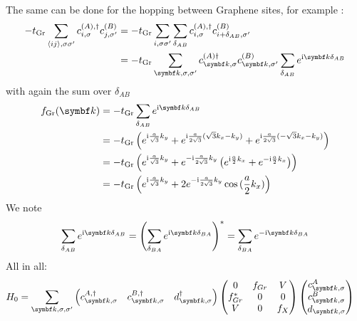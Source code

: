 \documentclass[../main.tex]{subfiles}
\begin{document}
The same can be done for the hopping between Graphene sites, for example :
\begin{align}
	-t_{\mathrm{Gr}} \sum_{\langle ij \rangle, \sigma \sigma^{\prime}} c_{i, \sigma}^{(A), \dagger} c_{j, \sigma^{\prime}}^{(B)}
	&= -t_{\mathrm{Gr}} \sum_{i, \sigma \sigma^{\prime}} \sum_{\delta_{AB}} c_{i, \sigma}^{(A), \dagger} c_{i + \delta_{AB} , \sigma^{\prime}}^{(B)} \\
	&= -t_{\mathrm{Gr}} \sum_{\vb{k}, \sigma, \sigma^{\prime}}  c_{\vb{k}, \sigma}^{(A) \dagger} c_{\vb{k}, \sigma^{\prime}}^{(B)} \sum_{\delta_{AB}} e^{\iu \vb{k} \delta_{AB}}
\end{align}
with again the sum over \(\delta_{AB}\)
\begin{align}
	f_{\mathrm{Gr}} (\vb{k}) &= -t_{\mathrm{Gr}} \sum_{\delta_{AB}} e^{\iu \vb{k} \delta_{AB}} \\
	&= -t_{\mathrm{Gr}} \left(
	e^{\iu \frac{a}{\sqrt{3}} k_y} +
	e^{\iu \frac{a}{2\sqrt{3}} (\sqrt{3} k_x - k_y)} +
	e^{\iu \frac{a}{2\sqrt{3}} (-\sqrt{3} k_x - k_y)} \right) \\
	&= -t_{\mathrm{Gr}} \left(
	e^{\iu \frac{a}{\sqrt{3}} k_y} +
	e^{-\iu \frac{a}{2\sqrt{3}} k_y} \left(
	e^{\iu \frac{a}{2} k_x} + e^{-\iu \frac{a}{2} k_x}
	\right) \right) \\
	&= -t_{\mathrm{Gr}} \left(
	e^{\iu \frac{a}{\sqrt{3}} k_y} +
	2 e^{-\iu \frac{a}{2\sqrt{3}} k_y}
	\cos{(\frac{a}{2} k_x)} \right)
\end{align}
We note 
\begin{align}
	\sum_{\delta_{AB}} e^{\iu \vb{k} \delta_{AB}} = \left( \sum_{\delta_{BA}} e^{\iu \vb{k} \delta_{BA}} \right)^* = \sum_{\delta_{BA}} e^{-\iu \vb{k} \delta_{BA}}
\end{align}
All in all:
\begin{align}
	H_0 &= \sum_{\vb{k}, \sigma, \sigma^{\prime}} \begin{pmatrix} c_{\vb{k}, \sigma}^{A, \dagger} & c_{\vb{k}, \sigma}^{B, \dagger} & d_{\vb{k}, \sigma}^{\dagger} \end{pmatrix}
	\begin{pmatrix}
		0 & f_{Gr} & V \\
		f_{Gr}^* & 0 & 0 \\
		V & 0 & f_{X}
	\end{pmatrix} \begin{pmatrix} c_{\vb{k}, \sigma}^{A} \\ c_{\vb{k}, \sigma}^{B} \\ d_{\vb{k}, \sigma} \end{pmatrix}
	\label{eq:EG-X Hamiltonian non-interacting matrix appendix}
\end{align}	
\end{document}
